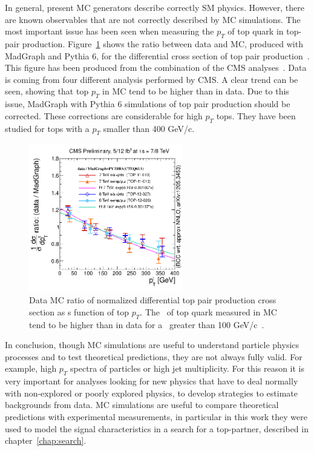 In general, present MC generators describe correctly SM physics. However, there are known observables that are not correctly described by MC simulations. The most important issue has been seen when measuring the $p_{T}$ of top quark in top-pair production. Figure~\ref{fig:TopPTReweighting} shows the ratio between data and MC, produced with MadGraph and Pythia 6, for the differential cross section of top pair production~\cite{Goerner:1754332}. This figure has been produced from the combination of the CMS analyses~\cite{Chatrchyan:2012saa,Chatrchyan:2013boa,Khachatryan:2015oqa}. Data is coming from four different analysis performed by CMS. A clear trend can be seen, showing that top $p_{T}$ in MC tend to be higher than in data. Due to this issue, MadGraph with Pythia 6 simulations of top pair production should be corrected. These corrections are considerable for high $p_{T}$ tops. They have been studied for tops with a $p_{T}$ smaller than 400 GeV/c.

\begin{figure}[!Hhtbp]
  \begin{center}
    \includegraphics[width=0.6\textwidth]{figs/topPtDataOverMadgraphPythia.png}
    \caption{Data MC ratio of normalized differential top pair production cross section as s function of top $p_{T}$. The \pt~of top quark measured in MC tend to be higher than in data for a \pt~greater than 100 GeV/c~\cite{Goerner:1754332}.}
    \label{fig:TopPTReweighting}
  \end{center}
\end{figure}

In conclusion, though MC simulations are useful to understand particle physics processes and to test theoretical predictions, they are not always fully valid. For example, high $p_{T}$ spectra of particles or high jet multiplicity. For this reason it is very important for analyses looking for new physics that have to deal normally with non-explored or poorly explored physics, to develop strategies to estimate backgrounds from data. MC simulations are useful to compare theoretical predictions with experimental measurements, in particular in this work they were used to model the signal characteristics in a search for a top-partner, described in chapter~\ref{chap:search}. 